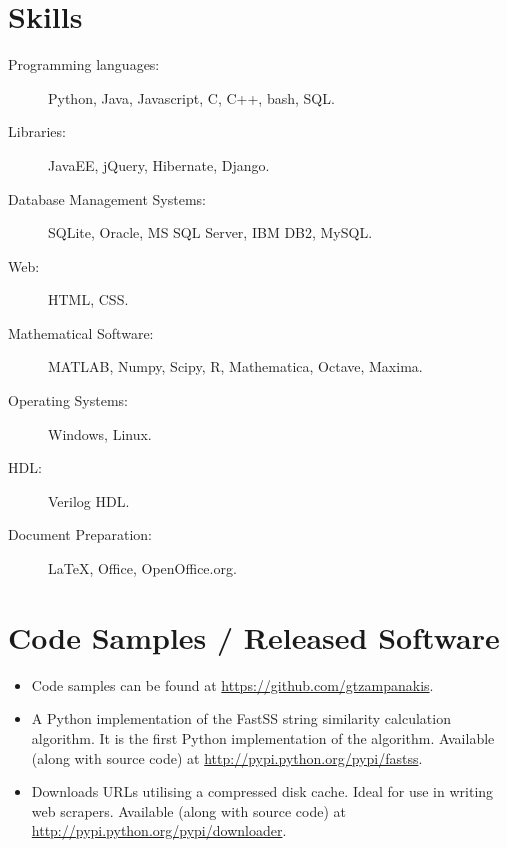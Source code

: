 \documentclass [a4paper,11pt]{article}
\begin{document}
	\section* {Skills}
		\begin {description}
			\item [Programming languages:] Python, Java, Javascript, C, C++, bash, SQL.
			\item [Libraries:] JavaEE, jQuery, Hibernate, Django.
			\item [Database Management Systems:] SQLite, Oracle, MS SQL Server, IBM DB2, MySQL.
			\item [Web:] HTML, CSS.
			\item [Mathematical Software:] MATLAB, Numpy, Scipy, R, Mathematica, Octave, Maxima.
			\item [Operating Systems:] Windows, Linux.
			\item [HDL:] Verilog HDL.
			\item [Document Preparation:] \LaTeX , Office, OpenOffice.org.
		\end {description}


	\section* {Code Samples / Released Software}
		\begin {itemize}

			\item Code samples can be found at \url{https://github.com/gtzampanakis}.

			\item A Python implementation of the FastSS string similarity
			calculation algorithm. It is the first Python implementation of the
			algorithm. Available (along with source code) at
			\url{http://pypi.python.org/pypi/fastss}.

			\item Downloads URLs utilising a compressed disk cache. Ideal for
			use in writing web scrapers. Available (along with source code) at
			\url{http://pypi.python.org/pypi/downloader}.

		\end {itemize}
\end{document}
